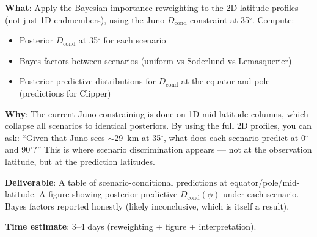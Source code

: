 \documentclass[11pt,a4paper]{article}
\begin{document}
\vspace{0.5em}

\begin{actionbox}
\textbf{What}: Apply the Bayesian importance reweighting to the 2D
latitude profiles (not just 1D endmembers), using the Juno $D_\mathrm{cond}$
constraint at 35$^\circ$. Compute:
\begin{itemize}[leftmargin=1.5em]
\item Posterior $D_\mathrm{cond}$ at 35$^\circ$ for each scenario
\item Bayes factors between scenarios (uniform vs Soderlund vs Lemasquerier)
\item Posterior predictive distributions for $D_\mathrm{cond}$ at the equator
      and pole (predictions for Clipper)
\end{itemize}

\textbf{Why}: The current Juno constraining is done on 1D mid-latitude
columns, which collapse all scenarios to identical posteriors. By using the
full 2D profiles, you can ask: ``Given that Juno sees $\sim$29~km at 35$^\circ$,
what does each scenario predict at 0$^\circ$ and 90$^\circ$?'' This is where
scenario discrimination appears --- not at the observation latitude, but
at the prediction latitudes.

\textbf{Deliverable}: A table of scenario-conditional predictions at
equator/pole/mid-latitude. A figure showing posterior predictive
$D_\mathrm{cond}(\phi)$ under each scenario. Bayes factors reported
honestly (likely inconclusive, which is itself a result).

\textbf{Time estimate}: 3--4 days (reweighting + figure + interpretation).
\end{actionbox}

\vspace{0.5em}
\end{document}

